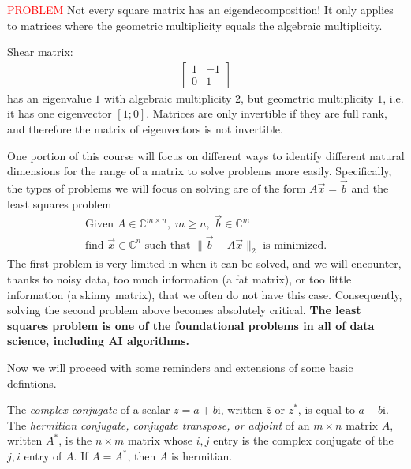 \documentclass{ximera}
\begin{document}
\textcolor{red}{PROBLEM} Not every square matrix has an eigendecomposition!  
It only applies to matrices where the geometric multiplicity equals the algebraic multiplicity.
\begin{example}
   Shear matrix:
   \begin{align}
       \begin{bmatrix}
           1 & -1\\ 0 & 1
       \end{bmatrix}
   \end{align}
   has an eigenvalue $1$ with algebraic multiplicity $2$, but geometric multiplicity $1$, i.e. it has one eigenvector $[1; 0]$.  Matrices are only invertible if they are full rank, and therefore the matrix of eigenvectors is not invertible.
 \end{example}

One portion of this course will focus on different ways to identify different natural dimensions for the range of a matrix to solve problems more easily.  Specifically, the types of problems we will focus on solving are of the form $A\vec{x} = \vec{b}$ and the least squares problem 
\begin{align}
    \text{Given } A \in \mathbb{C}^{m\times n}, \; m \geq n, \; \vec{b} \in \mathbb{C}^m \\
    \text{find } \vec{x} \in \mathbb{C}^n \text{ such that } \|\vec{b} - A\vec{x}\|_2 \text{ is minimized}.
 \end{align}
The first problem is very limited in when it can be solved, and we will encounter, thanks to noisy data, too much information (a fat matrix), or too little information (a skinny matrix), that we often do not have this case.  Consequently, solving the second problem above becomes absolutely critical.  \textbf{The least squares problem is one of the foundational problems in all of data science, including AI algorithms.}

Now we will proceed with some reminders and extensions of some basic defintions.
\begin{definition}
    The \textit{complex conjugate} of a scalar $z= a+b\mathrm{i}$, written $\overline{z}$ or $z^*$, is equal to $a-b\mathrm{i}$.  The \textit{hermitian conjugate, conjugate transpose, or adjoint} of an $m \times n$ matrix $A$, written $A^*$, is the $n \times m$ matrix whose $i,j$ entry is the complex conjugate of the $j,i$ entry of $A$.  If $A=A^*$, then $A$ is hermitian.
\end{definition}
\end{document}
